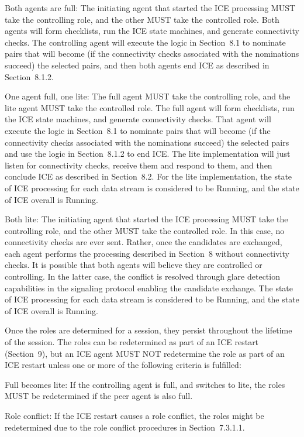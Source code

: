 \documentclass{article}
\begin{document}
Both agents are full:  The initiating agent that started the ICE processing MUST take the controlling role, and the other MUST take the controlled role.  Both agents will form checklists, run the ICE state machines, and generate connectivity checks.  The controlling agent will execute the logic in Section~8.1 to nominate pairs that will become (if the connectivity checks associated with the nominations succeed) the selected pairs, and then both agents end ICE as described in Section~8.1.2.

One agent full, one lite:  The full agent MUST take the controlling role, and the lite agent MUST take the controlled role.  The full agent will form checklists, run the ICE state machines, and generate connectivity checks.  That agent will execute the logic in Section~8.1 to nominate pairs that will become (if the connectivity checks associated with the nominations succeed) the selected pairs and use the logic in Section~8.1.2 to end ICE.  The lite implementation will just listen for connectivity checks, receive them and respond to them, and then conclude ICE as described in Section~8.2.  For the lite implementation, the state of ICE processing for each data stream is considered to be Running, and the state of ICE overall is Running.

Both lite:  The initiating agent that started the ICE processing MUST take the controlling role, and the other MUST take the controlled role.  In this case, no connectivity checks are ever sent. Rather, once the candidates are exchanged, each agent performs the processing described in Section~8 without connectivity checks.  It is possible that both agents will believe they are controlled or controlling.  In the latter case, the conflict is resolved through glare detection capabilities in the signaling protocol enabling the candidate exchange.  The state of ICE processing for each data stream is considered to be Running, and the state of ICE overall is Running.

Once the roles are determined for a session, they persist throughout the lifetime of the session.  The roles can be redetermined as part of an ICE restart (Section~9), but an ICE agent MUST NOT redetermine the role as part of an ICE restart unless one or more of the following criteria is fulfilled:

Full becomes lite:  If the controlling agent is full, and switches to lite, the roles MUST be redetermined if the peer agent is also full.

Role conflict:  If the ICE restart causes a role conflict, the roles might be redetermined due to the role conflict procedures in Section~7.3.1.1.
\end{document}
